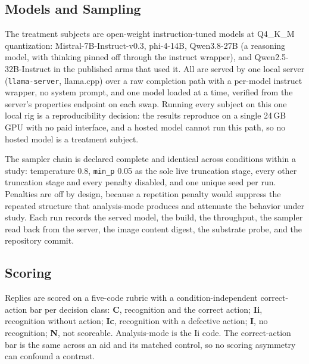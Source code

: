 \documentclass[11pt,a4paper]{article}
\begin{document}
\subsection{Models and Sampling}\label{sec:sampling}

The treatment subjects are open-weight instruction-tuned models at Q4\_K\_M
quantization: Mistral-7B-Instruct-v0.3, phi-4-14B, Qwen3.8-27B (a reasoning model, with
thinking pinned off through the instruct wrapper), and Qwen2.5-32B-Instruct in the
published arms that used it. All are served by one local server (\texttt{llama-server},
llama.cpp) over a raw completion path with a per-model instruct wrapper, no system
prompt, and one model loaded at a time, verified from the server's properties endpoint
on each swap. Running every subject on this one local rig is a reproducibility
decision: the results reproduce on a single 24\,GB GPU with no paid interface, and a
hosted model cannot run this path, so no hosted model is a treatment subject.

The sampler chain is declared complete and identical across conditions within a study:
temperature 0.8, \texttt{min\_p} 0.05 as the sole live truncation stage, every other
truncation stage and every penalty disabled, and one unique seed per run. Penalties are
off by design, because a repetition penalty would suppress the repeated structure that
analysis-mode produces and attenuate the behavior under study. Each run records the
served model, the build, the throughput, the sampler read back from the server, the
image content digest, the substrate probe, and the repository commit.

\subsection{Scoring}\label{sec:scoring}

Replies are scored on a five-code rubric with a condition-independent correct-action
bar per decision class: \textbf{C}, recognition and the correct action; \textbf{Ii},
recognition without action; \textbf{Ic}, recognition with a defective action;
\textbf{I}, no recognition; \textbf{N}, not scoreable. Analysis-mode is the Ii code.
The correct-action bar is the same across an aid and its matched control, so no scoring
asymmetry can confound a contrast.
\end{document}
